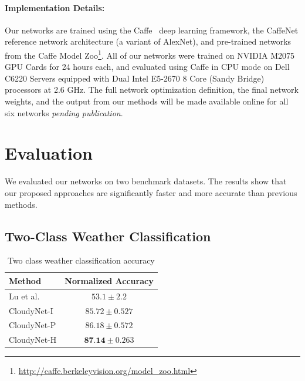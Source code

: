 \documentclass[10pt,twocolumn,letterpaper]{article}
\newcommand{\todo}[1]{\textcolor{red}{todo: {\em #1}}}
\begin{document}
%

\vspace{-1em}
\paragraph{Implementation Details:} Our networks are trained using the
Caffe~\cite{caffe14} deep learning framework, the CaffeNet reference network
architecture (a variant of AlexNet), and pre-trained networks
from the Caffe Model
Zoo\footnote{\url{http://caffe.berkeleyvision.org/model_zoo.html}}.
All of our networks were trained on NVIDIA M2075 GPU Cards for 24
hours each, and evaluated using Caffe in CPU mode on Dell C6220
Servers equipped with Dual Intel E5-2670 8 Core (Sandy Bridge)
processors at 2.6 GHz.  The full network optimization definition, the
final network weights, and the output from our methods will be made
available online for all six networks \emph{pending publication}.

\section{Evaluation}

We evaluated our networks on two benchmark datasets. The results show
that our proposed approaches are significantly faster and more
accurate than previous methods. 

\subsection{Two-Class Weather Classification}

\begin{table}[t]
	\centering
	\caption{Two class weather classification accuracy}
	\begin{tabular}{ | l | c | }
		\hline
			Method & Normalized Accuracy \\ \hline \hline
			Lu et al.~\cite{lutwoclass}& $ 53.1 \pm 2.2 $ \\ \hline
			CloudyNet-I & $ 85.72 \pm 0.527 $ \\ \hline
			CloudyNet-P & $ 86.18 \pm 0.572 $ \\ \hline
			CloudyNet-H & $ \textbf{87.14} \pm 0.263 $ \\ 
		\hline
	\end{tabular}
	\label{tbl:twoclass}
\end{table}
\end{document}
